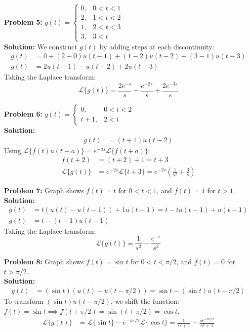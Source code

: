 \documentclass[11pt, letterpaper]{article}
\theoremstyle{definition}
\theoremstyle{remark}
\newcommand{\Lap}{\mathcal{L}}
\begin{document}
\textbf{Problem 5:} $g(t) = \begin{cases} 0, & 0 < t < 1 \\ 2, & 1 < t < 2 \\ 1, & 2 < t < 3 \\ 3, & 3 < t \end{cases}$
\\[4pt]
\textbf{Solution:}
We construct $g(t)$ by adding steps at each discontinuity:
\begin{align*}
g(t) &= 0 + (2 - 0)u(t-1) + (1 - 2)u(t-2) + (3 - 1)u(t-3) \\
g(t) &= 2u(t-1) - u(t-2) + 2u(t-3)
\end{align*}
Taking the Laplace transform:
\[
\Lap\{g(t)\} = \frac{2e^{-s}}{s} - \frac{e^{-2s}}{s} + \frac{2e^{-3s}}{s}
\]

\textbf{Problem 6:} $g(t) = \begin{cases} 0, & 0 < t < 2 \\ t+1, & 2 < t \end{cases}$
\\[4pt]
\textbf{Solution:}
\begin{align*}
g(t) &= (t+1)u(t-2)
\end{align*}
Using $\Lap\{f(t)u(t-a)\} = e^{-as}\Lap\{f(t+a)\}$:
\begin{align*}
f(t+2) &= (t+2) + 1 = t + 3 \\
\Lap\{g(t)\} &= e^{-2s}\Lap\{t+3\} = e^{-2s}\left(\frac{1}{s^2} + \frac{3}{s}\right)
\end{align*}

\textbf{Problem 7:} Graph shows $f(t) = t$ for $0 < t < 1$, and $f(t) = 1$ for $t > 1$.
\\[4pt]
\textbf{Solution:}
\begin{align*}
g(t) &= t(u(t) - u(t-1)) + 1u(t-1) = t - t u(t-1) + u(t-1) \\
g(t) &= t - (t-1)u(t-1)
\end{align*}
Taking the Laplace transform:
\[
\Lap\{g(t)\} = \frac{1}{s^2} - \frac{e^{-s}}{s^2}
\]

\textbf{Problem 8:} Graph shows $f(t) = \sin t$ for $0 < t < \pi/2$, and $f(t) = 0$ for $t > \pi/2$.
\\[4pt]
\textbf{Solution:}
\begin{align*}
g(t) &= (\sin t)(u(t) - u(t-\pi/2)) = \sin t - (\sin t)u(t-\pi/2)
\end{align*}
To transform $(\sin t)u(t-\pi/2)$, we shift the function: $f(t) = \sin t \implies f(t+\pi/2) = \sin(t+\pi/2) = \cos t$.
\begin{align*}
\Lap\{g(t)\} &= \Lap\{\sin t\} - e^{-\pi s / 2}\Lap\{\cos t\} = \frac{1}{s^2+1} - \frac{s e^{-\pi s / 2}}{s^2+1}
\end{align*}
\end{document}
